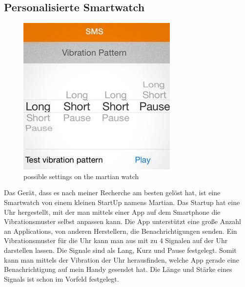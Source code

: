 \subsection{Personalisierte Smartwatch}
\label{ch:Grundlagen:sec:RelatedWork:subsec:PersonalisierteSmartwatch}

\begin{figure}
	\centering
    \includegraphics[width=\textwidth]{pics/martian.jpg}
    \caption{possible settings on the martian watch}
    \label{fig:martian}
\end{figure}

Das Ger{\"a}t, dass es nach meiner Recherche am besten gel{\"o}st hat, ist eine Smartwatch von einem kleinen StartUp namens Martian. 
Das Startup hat eine Uhr hergestellt, mit der man mittels einer App auf dem Smartphone die Vibrationsmuster selbst anpassen kann. 
Die App unterst{\"u}tzt eine gro{\ss}e Anzahl an Applications, von anderen Herstellern, die Benachrichtigungen senden. Ein Vibrationsmuster f{\"u}r die Uhr kann man aus mit zu 4 Signalen auf der Uhr darstellen lassen. Die Signale sind als Lang, Kurz und Pause festgelegt. 
Somit kann man mittels der Vibration der Uhr herausfinden, welche App gerade eine Benachrichtigung auf mein Handy gesendet hat. Die L{\"a}nge und St{\"a}rke eines Signals ist schon im Vorfeld festgelegt.

